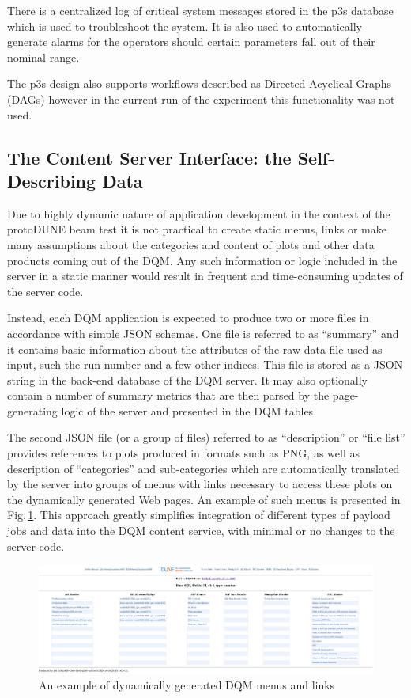 \documentclass{webofc}
\newcommand{\pd}{protoDUNE\xspace}
\begin{document}
There is a centralized log of critical system messages stored in the p3s database which
is used to troubleshoot the system. It is also used to automatically generate alarms
for the operators should certain parameters fall out of their nominal range.

The p3s design also supports workflows described as Directed Acyclical Graphs (DAGs)
however in the current run of the experiment this functionality was not used.

\subsection{The Content Server Interface: the Self-Describing Data}
Due to highly dynamic nature of application development in the context of the \pd beam
test it is not practical to create static menus, links or make many assumptions about
the categories and content of plots and other data products coming out of the DQM.
Any such information or logic included in the server in a static manner would result
in frequent and time-consuming updates of the server code.

Instead, each DQM application is expected to produce two or more files in accordance
with simple JSON schemas. One file is referred to as ``summary'' and it contains basic
information about the attributes of the raw data file used as input, such the run number
and a few other indices. This file is stored as a JSON string in the back-end database
of the DQM server. It may also optionally contain a number of summary metrics
that are then parsed by the page-generating logic of the server and presented
in the DQM tables.

The second JSON file (or a group of files) referred to as ``description'' or ``file list'' provides references to
plots produced in formats such as PNG, as well as description of ``categories''
and sub-categories which are automatically translated by the server into
groups of menus with links necessary to access these plots on the dynamically generated
Web pages. An example of such menus is presented in Fig.\,\ref{fig:tpc_monitor}.
This approach greatly simplifies integration of different types of payload jobs 
and data into the DQM content service, with minimal or no changes to the
server code.

\begin{figure}[tb]
\centering\includegraphics[width=1.0\textwidth]{figures/tpc_monitor_2018_v1.png}
\caption{\label{fig:tpc_monitor}An example of dynamically generated DQM menus and links}
\end{figure}
\end{document}
